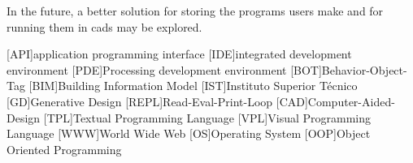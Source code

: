 \documentclass{./llncs2e/llncs}
\begin{document}
	In the future, a better solution for storing the programs users make and for running them in \ac{cad}s may be explored.
	
	
\newpage

\begin{acronym}
	[API]{application programming interface}
	[IDE]{integrated development environment}
	[PDE]{Processing development environment}
	[BOT]{Behavior-Object-Tag}
	[BIM]{Building Information Model}
	[IST]{Instituto Superior Técnico}
	[GD]{Generative Design}
	[REPL]{Read-Eval-Print-Loop}
	[CAD]{Computer-Aided-Design}
	[TPL]{Textual Programming Language}
	[VPL]{Visual Programming Language}
	[WWW]{World Wide Web}
	[OS]{Operating System}
	[OOP]{Object Oriented Programming}
\end{acronym}

% 
% 
 

 
\end{document}

